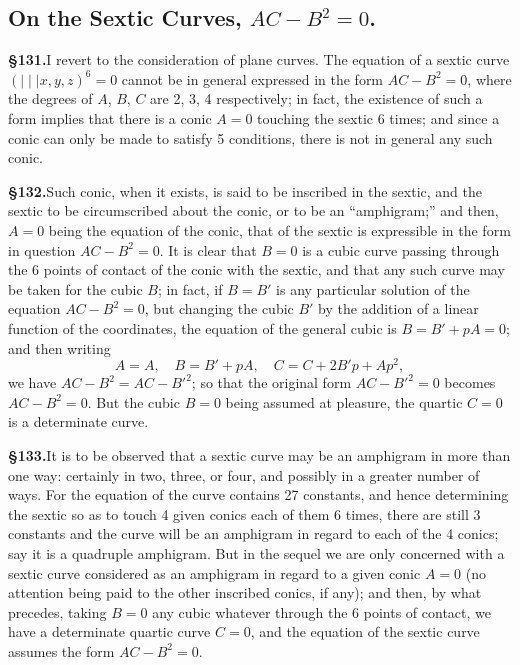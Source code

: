 \documentclass[11pt,a4paper]{article}
\begin{document}
\subsection*{On the Sextic Curves, $AC - B^2 = 0$.}

\textbf{\S 131.}\quad I revert to the consideration of plane curves. The equation of a sextic curve $(\mid\mid\mid x, y, z)^6 = 0$ cannot be in general expressed in the form $AC - B^2 = 0$, where the degrees of $A$, $B$, $C$ are 2, 3, 4 respectively; in fact, the existence of such a form implies that there is a conic $A = 0$ touching the sextic 6 times; and since a conic can only be made to satisfy 5 conditions, there is not in general any such conic.

\textbf{\S 132.}\quad Such conic, when it exists, is said to be inscribed in the sextic, and the sextic to be circumscribed about the conic, or to be an ``amphigram;'' and then, $A = 0$ being the equation of the conic, that of the sextic is expressible in the form in question $AC - B^2 = 0$. It is clear that $B = 0$ is a cubic curve passing through the 6 points of contact of the conic with the sextic, and that any such curve may be taken for the cubic $B$; in fact, if $B = B'$ is any particular solution of the equation $AC - B^2 = 0$, but changing the cubic $B'$ by the addition of a linear function of the coordinates, the equation of the general cubic is $B = B' + pA = 0$; and then writing
\[
A = A,\quad B = B' + pA,\quad C = C + 2B'p + Ap^2,
\]
we have $AC - B^2 = AC - B'^2$; so that the original form $AC - B'^2 = 0$ becomes $AC - B^2 = 0$. But the cubic $B = 0$ being assumed at pleasure, the quartic $C = 0$ is a determinate curve.

\textbf{\S 133.}\quad It is to be observed that a sextic curve may be an amphigram in more than one way: certainly in two, three, or four, and possibly in a greater number of ways. For the equation of the curve contains 27 constants, and hence determining the sextic so as to touch 4 given conics each of them 6 times, there are still 3 constants and the curve will be an amphigram in regard to each of the 4 conics; say it is a quadruple amphigram. But in the sequel we are only concerned with a sextic curve considered as an amphigram in regard to a given conic $A = 0$ (no attention being paid to the other inscribed conics, if any); and then, by what precedes, taking $B = 0$ any cubic whatever through the 6 points of contact, we have a determinate quartic curve $C = 0$, and the equation of the sextic curve assumes the form $AC - B^2 = 0$.
\end{document}
